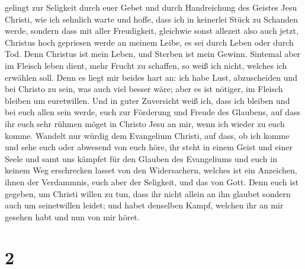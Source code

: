 gelingt zur Seligkeit durch euer Gebet und durch Handreichung des
Geistes Jesu Christi,  wie ich sehnlich warte und hoffe,
dass ich in keinerlei Stück zu Schanden werde, sondern dass mit aller
Freudigkeit, gleichwie sonst allezeit also auch jetzt, Christus hoch
gepriesen werde an meinem Leibe, es sei durch Leben oder durch Tod.
 Denn Christus ist mein Leben, und Sterben ist mein
Gewinn.  Sintemal aber im Fleisch leben dient, mehr
Frucht zu schaffen, so weiß ich nicht, welches ich erwählen soll.
 Denn es liegt mir beides hart an: ich habe Lust,
abzuscheiden und bei Christo zu sein, was auch viel besser wäre;
 aber es ist nötiger, im Fleisch bleiben um euretwillen.
 Und in guter Zuversicht weiß ich, dass ich bleiben und
bei euch allen sein werde, euch zur Förderung und Freude des Glaubens,
 auf dass ihr euch sehr rühmen möget in Christo Jesu an
mir, wenn ich wieder zu euch komme.  Wandelt nur würdig
dem Evangelium Christi, auf dass, ob ich komme und sehe euch oder
abwesend von euch höre, ihr steht in einem Geist und einer Seele und
samt uns kämpfet für den Glauben des Evangeliums  und
euch in keinem Weg erschrecken lasset von den Widersachern, welches ist
ein Anzeichen, ihnen der Verdammnis, euch aber der Seligkeit, und das
von Gott.  Denn euch ist gegeben, um Christi willen zu
tun, dass ihr nicht allein an ihn glaubet sondern auch um seinetwillen
leidet;  und habet denselben Kampf, welchen ihr an mir
gesehen habt und nun von mir höret.

\hypertarget{section-1}{%
\section{2}\label{section-1}}

